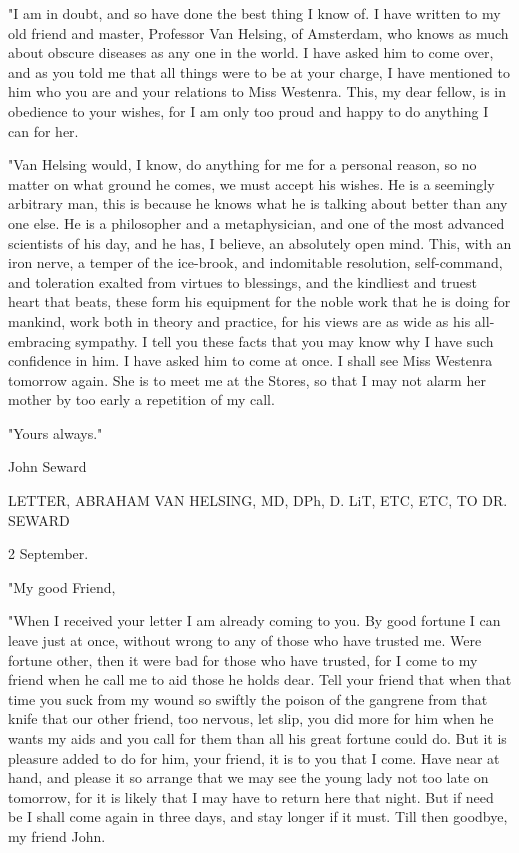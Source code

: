 "I am in doubt, and so have done the best thing I know of. I have written to my old friend and master, Professor Van Helsing, of Amsterdam, who knows as much about obscure diseases as any one in the world. I have asked him to come over, and as you told me that all things were to be at your charge, I have mentioned to him who you are and your relations to Miss Westenra. This, my dear fellow, is in obedience to your wishes, for I am only too proud and happy to do anything I can for her. 

"Van Helsing would, I know, do anything for me for a personal reason, so no matter on what ground he comes, we must accept his wishes. He is a seemingly arbitrary man, this is because he knows what he is talking about better than any one else. He is a philosopher and a metaphysician, and one of the most advanced scientists of his day, and he has, I believe, an absolutely open mind. This, with an iron nerve, a temper of the ice-brook, and indomitable resolution, self-command, and toleration exalted from virtues to blessings, and the kindliest and truest heart that beats, these form his equipment for the noble work that he is doing for mankind, work both in theory and practice, for his views are as wide as his all-embracing sympathy. I tell you these facts that you may know why I have such confidence in him. I have asked him to come at once. I shall see Miss Westenra tomorrow again. She is to meet me at the Stores, so that I may not alarm her mother by too early a repetition of my call. 

"Yours always." 

John Seward 

LETTER, ABRAHAM VAN HELSING, MD, DPh, D. LiT, ETC, ETC, TO DR. SEWARD 

2 September. 

"My good Friend, 

"When I received your letter I am already coming to you. By good fortune I can leave just at once, without wrong to any of those who have trusted me. Were fortune other, then it were bad for those who have trusted, for I come to my friend when he call me to aid those he holds dear. Tell your friend that when that time you suck from my wound so swiftly the poison of the gangrene from that knife that our other friend, too nervous, let slip, you did more for him when he wants my aids and you call for them than all his great fortune could do. But it is pleasure added to do for him, your friend, it is to you that I come. Have near at hand, and please it so arrange that we may see the young lady not too late on tomorrow, for it is likely that I may have to return here that night. But if need be I shall come again in three days, and stay longer if it must. Till then goodbye, my friend John. 

